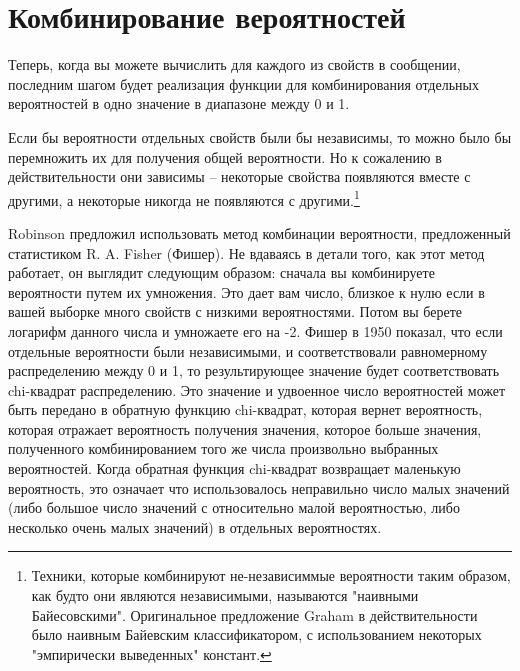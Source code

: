 \section{Комбинирование вероятностей}

Теперь, когда вы можете вычислить  для каждого из свойств
в сообщении, последним шагом будет реализация функции  для комбинирования
отдельных вероятностей в одно значение в диапазоне между 0 и 1.

Если бы вероятности отдельных свойств были бы независимы, то можно было бы перемножить их
для получения общей вероятности.  Но к сожалению в действительности они зависимы --
некоторые свойства появляются вместе с другими, а некоторые никогда не появляются с
другими.\footnote{Техники, которые комбинируют не-независиммые вероятности таким образом,
  как будто они являются независимыми, называются "наивными Байесовскими".  Оригинальное
  предложение Graham в действительности было наивным Байевским классификатором, с
  использованием некоторых "эмпирически выведенных" констант.}

Robinson предложил использовать метод комбинации вероятности, предложенный статистиком
R. A. Fisher (Фишер).  Не вдаваясь в детали того, как этот метод работает, он выглядит
следующим образом: сначала вы комбинируете вероятности путем их умножения.  Это дает вам
число, близкое к нулю если в вашей выборке много свойств с низкими вероятностями.  Потом
вы берете логарифм данного числа и умножаете его на -2.  Фишер в 1950 показал, что если
отдельные вероятности были независимыми, и соответствовали равномерному распределению
между 0 и 1, то результирующее значение будет соответствовать chi-квадрат
распределению. Это значение и удвоенное число вероятностей может быть передано в обратную
функцию chi-квадрат, которая вернет вероятность, которая отражает вероятность получения
значения, которое больше значения, полученного комбинированием того же числа произвольно
выбранных вероятностей.  Когда обратная функция chi-квадрат возвращает маленькую
вероятность, это означает что использовалось неправильно число малых значений (либо
большое число значений с относительно малой вероятностью, либо несколько очень малых
значений) в отдельных вероятностях.

